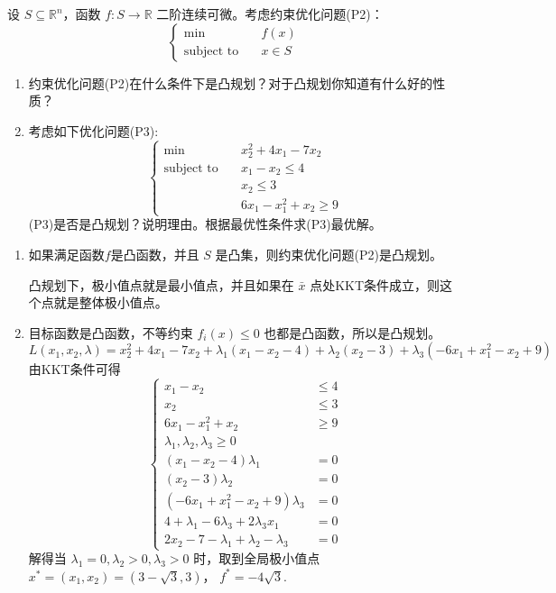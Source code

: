 

\newcommand\Title{最优化方法第9次作业}

\newcommand\subject{\operatorname{subject\ to}}


\begin{problem}
    设 $S \subseteq \mathbb{R}^n$，函数 $f: S \to \mathbb{R}$ 二阶连续可微。考虑约束优化问题(P2)：\[\begin{cases}
        \min\quad &f(x)\\
        \subject \quad &x \in S
    \end{cases}\]
    \begin{enumerate}
        \item 约束优化问题(P2)在什么条件下是凸规划？对于凸规划你知道有什么好的性质？
        \item 考虑如下优化问题(P3):\[\begin{cases}
            \min\quad &x_2^2 + 4x_1 - 7x_2\\
            \subject \quad &x_1 - x_2 \le 4\\
            &x_2 \le 3\\
            & 6x_1 - x_1^2 + x_2 \ge 9
        \end{cases}\]
        (P3)是否是凸规划？说明理由。根据最优性条件求(P3)最优解。
    \end{enumerate}
    \Answer\text{}\begin{enumerate}
        \item 如果满足函数$f$是凸函数，并且 $S$ 是凸集，则约束优化问题(P2)是凸规划。
        
        凸规划下，极小值点就是最小值点，并且如果在 $\bar{x}$ 点处KKT条件成立，则这个点就是整体极小值点。
        \item 目标函数是凸函数，不等约束 $f_i(x) \le 0$ 也都是凸函数，所以是凸规划。\[L(x_1, x_2, \lambda) = x_2^2 + 4x_1 - 7x_2 + \lambda_1(x_1 - x_2 - 4) + \lambda_2(x_2 - 3) + \lambda_3(-6x_1 + x_1^2 - x_2 + 9)\]
        由KKT条件可得\[\begin{cases}
            x_1 - x_2 &\le 4\\
            x_2 &\le 3\\
            6x_1 - x_1^2 + x_2 &\ge 9\\
            \lambda_1, \lambda_2, \lambda_3 \ge 0\\
            (x_1 - x_2 - 4)\lambda_1 &= 0\\
            (x_2 - 3)\lambda_2 &= 0\\
            (-6x_1 + x_1^2 - x_2 + 9)\lambda_3 &= 0\\
            4 + \lambda_1 - 6\lambda_3 + 2\lambda_3x_1 &= 0\\
            2x_2 - 7 - \lambda_1 + \lambda_2 - \lambda_3 &= 0
        \end{cases}\]
        解得当 $\lambda_1 = 0, \lambda_2 > 0, \lambda_3 > 0$ 时，取到全局极小值点 $x^* = (x_1, x_2) = (3 - \sqrt{3}, 3)$， $f^* = -4\sqrt{3}$. 
    \end{enumerate}
\end{problem}

